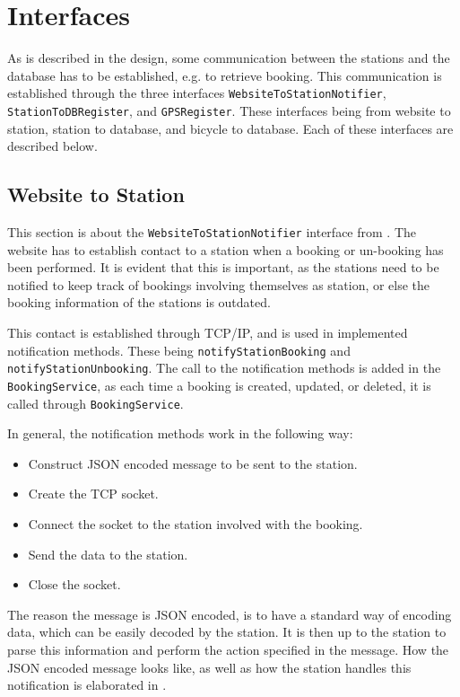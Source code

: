 \section{Interfaces}\label{sec:interfaces}
As is described in the design, some communication between the stations and the database has to be established, e.g. to retrieve booking.
This communication is established through the three interfaces \texttt{WebsiteToStationNotifier}, \texttt{StationToDBRegister}, and \texttt{GPSRegister}.
These interfaces being from website to station, station to database, and bicycle to database.
Each of these interfaces are described below.

\subsection{Website to Station}\label{sec:webToStationI}
This section is about the \texttt{WebsiteToStationNotifier} interface from .
The website has to establish contact to a station when a booking or un-booking has been performed.
It is evident that this is important, as the stations need to be notified to keep track of bookings involving themselves as station, or else the booking information of the stations is outdated.

This contact is established through TCP/IP, and is used in implemented notification methods.
These being \texttt{notifyStationBooking} and \texttt{notify\-Station\-Unbooking}.
The call to the notification methods is added in the \texttt{BookingService}, as each time a booking is created, updated, or deleted, it is called through \texttt{BookingService}.

In general, the notification methods work in the following way:
\begin{itemize}
	\item Construct JSON encoded message to be sent to the station.
	\item Create the TCP socket.
	\item Connect the socket to the station involved with the booking.
	\item Send the data to the station.
	\item Close the socket.
\end{itemize}

The reason the message is JSON encoded, is to have a standard way of encoding data, which can be easily decoded by the station.
It is then up to the station to parse this information and perform the action specified in the message.
How the JSON encoded message looks like, as well as how the station handles this notification is elaborated in .

